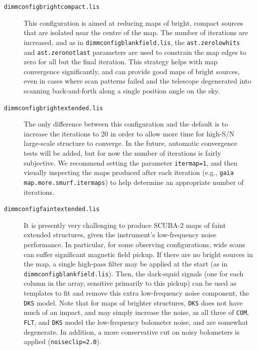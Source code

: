 \documentclass[twoside,11pt]{article}
\renewcommand{\_}{\texttt{\symbol{95}}}
\begin{document}
\begin{description}
\item[\texttt{dimmconfig\_bright\_compact.lis}]\quad This
  configuration is aimed at reducing maps of bright, compact sources
  that are isolated near the centre of the map. The number of
  iterations are increased, and as in
  \texttt{dimmconfig\_blank\_field.lis}, the
  \texttt{ast.zero\_lowhits} and \texttt{ast.zero\_notlast} parameters
  are used to constrain the map edges to zero for all but the final
  iteration. This strategy helps with map convergence significantly,
  and can provide good maps of bright sources, even in cases where
  scan patterns failed and the telescope degenerated into scanning
  back-and-forth along a single position angle on the sky.

\item[\texttt{dimmconfig\_bright\_extended.lis}]\quad The only
  difference between this configuration and the default is to increase
  the iterations to 20 in order to allow more time for high-S/N
  large-scale structure to converge. In the future, automatic
  convergence tests will be added, but for now the number of
  iterations is fairly subjective. We recommend setting the parameter
  \texttt{itermap=1}, and then visually inspecting the maps produced
  after each iteration (e.g., \texttt{gaia map.more.smurf.itermaps})
  to help determine an appropriate number of iterations.


\item[\texttt{dimmconfig\_faint\_extended.lis}]\quad It is presently
  very challenging to produce SCUBA-2 maps of faint extended
  structures, given the instrument's low-frequency noise
  performance. In particular, for some observing configurations, wide
  scans can suffer significant magnetic field pickup. If there are no
  bright sources in the map, a single high-pass filter may be applied
  at the start (as in \texttt{dimmconfig\_blank\_field.lis}). Then,
  the dark-squid signals (one for each column in the array, sensitive
  primarily to this pickup) can be used as templates to fit and remove
  this extra low-frequency noise component, the \texttt{DKS}
  model. Note that for maps of brighter structures, \texttt{DKS} does
  not have much of an impact, and may simply increase the noise, as
  all three of \texttt{COM}, \texttt{FLT}, and \texttt{DKS} model the
  low-frequency bolometer noise, and are somewhat degenerate.  In
  addition, a more conservative cut on noisy bolometers is applied
  (\texttt{noiseclip=2.0}).


\end{description}
\end{document}
